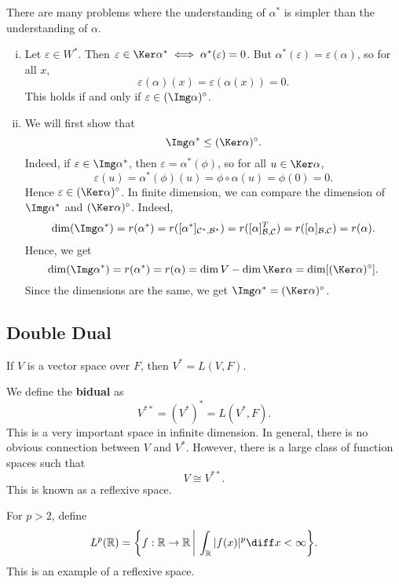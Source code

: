 \documentclass[12pt]{article}
\begin{document}
There are many problems where the understanding of $\alpha^{\ast}$ is simpler than the understanding of $\alpha$.

\begin{proofbox}
\begin{enumerate}[(i)]
	\item Let $\varepsilon \in W^{\ast}$. Then $\varepsilon \in \Ker \alpha^{\ast} \iff \alpha^{\ast} (\varepsilon) = 0$. But $\alpha^{\ast}(\varepsilon) = \varepsilon(\alpha)$, so for all $x$,
			\[
				\varepsilon(\alpha)(x) = \varepsilon(\alpha(x)) = 0
			.\]
			This holds if and only if $\varepsilon \in (\Img \alpha)^{\circ}$.
		\item We will first show that
			 \[
				 \Img \alpha^{\ast} \leq (\Ker \alpha)^{\circ}
			.\]
			Indeed, if $\varepsilon \in \Img \alpha^{\ast}$, then $\varepsilon = \alpha^{\ast}(\phi)$, so for all $u \in \Ker \alpha$,
			\[
				\varepsilon(u) = \alpha^{\ast}(\phi) (u) = \phi \circ \alpha(u) = \phi(0) = 0
			.\]
			Hence $\varepsilon \in (\Ker \alpha)^{\circ}$. In finite dimension, we can compare the dimension of $\Img \alpha^{\ast}$ and $(\Ker \alpha)^{\circ}$. Indeed,
			\[
				\dim (\Img \alpha^{\ast}) = r(\alpha^{\ast}) = r([\alpha^{\ast}]_{\mathcal{C}^{\ast}, \mathcal{B}^{\ast}}) = r([\alpha]_{\mathcal{B},\mathcal{C}}^{T}) = r([\alpha]_{\mathcal{B}, \mathcal{C}}) = r(\alpha)
			.\]
			Hence, we get
			\[
				\dim (\Img \alpha^{\ast}) = r(\alpha^{\ast}) = r(\alpha) = \dim V - \dim \Ker \alpha = \dim [(\Ker \alpha)^{\circ}]
			.\]
			Since the dimensions are the same, we get $\Img \alpha^{\ast} = (\Ker \alpha)^{\circ}$.
\end{enumerate}
\end{proofbox}

\subsection{Double Dual}%
\label{sub:double_dual}

If $V$ is a vector space over $F$, then $V^{\ast} = L(V, F)$.

We define the \textbf{bidual} as
\[
	V^{\ast \ast} = (V^{\ast})^{\ast} = L(V^{\ast}, F)
.\]
This is a very important space in infinite dimension. In general, there is no obvious connection between $V$ and $V^{\ast}$. However, there is a large class of function spaces such that
\[
V \cong V^{\ast \ast}
.\]
This is known as a reflexive space.

\begin{exbox}
	For $p > 2$, define
	\[
		L^{p}(\mathbb{R}) = \biggl\{ f : \mathbb{R} \to \mathbb{R} \,\bigg\vert\, \int_{\mathbb{R}} |f(x)|^{p} \diff x < \infty \biggr\}
	.\]
	This is an example of a reflexive space.
\end{exbox}
\end{document}

